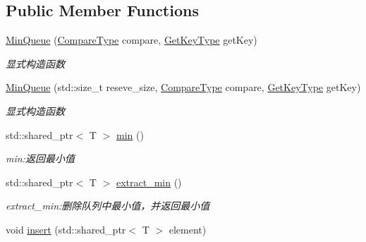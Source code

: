 \subsection*{Public Member Functions}
\begin{DoxyCompactItemize}
\item 
\hyperlink{class_introduction_to_algorithm_1_1_queue_algorithm_1_1_min_queue_a98e54e4e2c19918032b09e23e79a25e5}{Min\+Queue} (\hyperlink{class_introduction_to_algorithm_1_1_queue_algorithm_1_1_min_queue_a8f2f5b5d2b7097bbc6edda7b9c9228a6}{Compare\+Type} compare, \hyperlink{class_introduction_to_algorithm_1_1_queue_algorithm_1_1_min_queue_a391cb754ab172d1d4cdefd34130b917c}{Get\+Key\+Type} get\+Key)
\begin{DoxyCompactList}\small\item\em 显式构造函数 \end{DoxyCompactList}\item 
\hyperlink{class_introduction_to_algorithm_1_1_queue_algorithm_1_1_min_queue_a770243b2227a15bdc2105dde6549c745}{Min\+Queue} (std\+::size\+\_\+t reseve\+\_\+size, \hyperlink{class_introduction_to_algorithm_1_1_queue_algorithm_1_1_min_queue_a8f2f5b5d2b7097bbc6edda7b9c9228a6}{Compare\+Type} compare, \hyperlink{class_introduction_to_algorithm_1_1_queue_algorithm_1_1_min_queue_a391cb754ab172d1d4cdefd34130b917c}{Get\+Key\+Type} get\+Key)
\begin{DoxyCompactList}\small\item\em 显式构造函数 \end{DoxyCompactList}\item 
std\+::shared\+\_\+ptr$<$ T $>$ \hyperlink{class_introduction_to_algorithm_1_1_queue_algorithm_1_1_min_queue_a96293074ee6adef713e9e47059958ea2}{min} ()
\begin{DoxyCompactList}\small\item\em min\+:返回最小值 \end{DoxyCompactList}\item 
std\+::shared\+\_\+ptr$<$ T $>$ \hyperlink{class_introduction_to_algorithm_1_1_queue_algorithm_1_1_min_queue_a71022b9e1e9993ec5c5876da9e6e6eee}{extract\+\_\+min} ()
\begin{DoxyCompactList}\small\item\em extract\+\_\+min\+:删除队列中最小值，并返回最小值 \end{DoxyCompactList}\item 
void \hyperlink{class_introduction_to_algorithm_1_1_queue_algorithm_1_1_min_queue_afd899c42140b42a75507ed05ce98d047}{insert} (std\+::shared\+\_\+ptr$<$ T $>$ element)

\end{DoxyCompactItemize}
